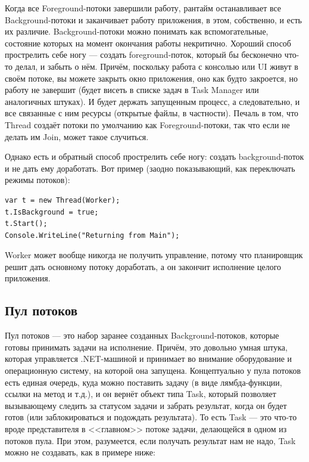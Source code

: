 \documentclass{../../text-style}
\begin{document}
Когда все Foreground-потоки завершили работу, рантайм останавливает все Background-потоки и заканчивает работу приложения, в этом, собственно, и есть их различие. Background-потоки можно понимать как вспомогательные, состояние которых на момент окончания работы некритично. Хороший способ прострелить себе ногу --- создать foreground-поток, который бы бесконечно что-то делал, и забыть о нём. Причём, поскольку работа с консолью или UI живут в своём потоке, вы можете закрыть окно приложения, оно как будто закроется, но работу не завершит (будет висеть в списке задач в Task Manager или аналогичных штуках). И будет держать запущенным процесс, а следовательно, и все связанные с ним ресурсы (открытые файлы, в частности). Печаль в том, что Thread создаёт потоки по умолчанию как Foreground-потоки, так что если не делать им Join, может такое случиться.

Однако есть и обратный способ прострелить себе ногу: создать background-поток и не дать ему доработать. Вот пример (заодно показывающий, как переключать режимы потоков):

\begin{verbatim}
var t = new Thread(Worker);
t.IsBackground = true;
t.Start();
Console.WriteLine("Returning from Main");
\end{verbatim}

Worker может вообще никогда не получить управление, потому что планировщик решит дать основному потоку доработать, а он закончит исполнение целого приложения.

\subsection{Пул потоков}

Пул потоков --- это набор заранее созданных Background-потоков, которые готовы принимать задачи на исполнение. Причём, это довольно умная штука, которая управляется .NET-машиной и принимает во внимание оборудование и операционную систему, на которой она запущена. Концептуально у пула потоков есть единая очередь, куда можно поставить задачу (в виде лямбда-функции, ссылки на метод и т.д.), и он вернёт объект типа Task, который позволяет вызывающему следить за статусом задачи и забрать результат, когда он будет готов (или заблокироваться и подождать результата). То есть Task --- это что-то вроде представителя в <<главном>> потоке задачи, делающейся в одном из потоков пула. При этом, разумеется, если получать результат нам не надо, Task можно не создавать, как в примере ниже:
\end{document}
